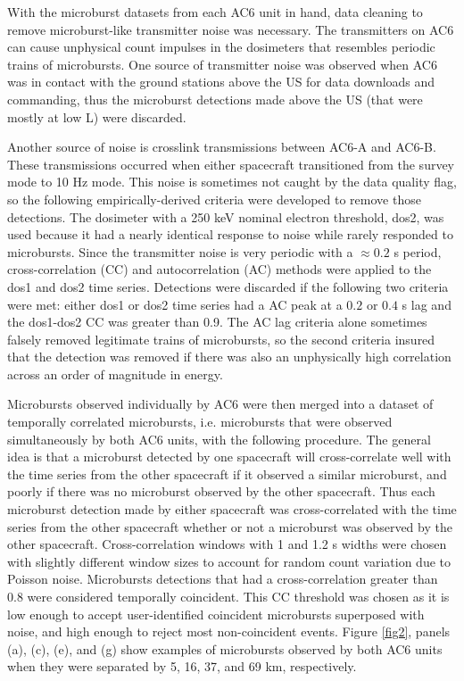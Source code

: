\documentclass[draft]{agujournal2019}
\begin{document}
With the microburst datasets from each AC6 unit in hand, data cleaning to remove microburst-like transmitter noise was necessary. The transmitters on AC6 can cause unphysical count impulses in the dosimeters that resembles periodic trains of microbursts. One source of transmitter noise was observed when AC6 was in contact with the ground stations above the US for data downloads and commanding, thus the microburst detections made above the US (that were mostly at low L) were discarded. 

Another source of noise is crosslink transmissions between AC6-A and AC6-B. These transmissions occurred when either spacecraft transitioned from the survey mode to 10 Hz mode. This noise is sometimes not caught by the data quality flag, so the following empirically-derived criteria were developed to remove those detections. The dosimeter with a 250 keV nominal electron threshold, dos2, was used because it had a nearly identical response to noise while rarely responded to microbursts. Since the transmitter noise is very periodic with a $\approx 0.2$ s period, cross-correlation (CC) and autocorrelation (AC) methods were applied to the dos1 and dos2 time series. Detections were discarded if the following two criteria were met: either dos1 or dos2 time series had a AC peak at a $0.2$ or $0.4$ s lag and the dos1-dos2 CC was greater than 0.9. The AC lag criteria alone sometimes falsely removed legitimate trains of microbursts, so the second criteria insured that the detection was removed if there was also an unphysically high correlation across an order of magnitude in energy.

Microbursts observed individually by AC6 were then merged into a dataset of temporally correlated microbursts, i.e. microbursts that were observed simultaneously by both AC6 units, with the following procedure. The general idea is that a microburst detected by one spacecraft will cross-correlate well with the time series from the other spacecraft if it observed a similar microburst, and poorly if there was no microburst observed by the other spacecraft. Thus each microburst detection made by either spacecraft was cross-correlated with the time series from the other spacecraft whether or not a microburst was observed by the other spacecraft. Cross-correlation windows with 1 and 1.2 s widths were chosen with slightly different window sizes to account for random count variation due to Poisson noise. Microbursts detections that had a cross-correlation greater than $0.8$ were considered temporally coincident. This CC threshold was chosen as it is low enough to accept user-identified coincident microbursts superposed with noise, and high enough to reject most non-coincident events. Figure \ref{fig2}, panels (a), (c), (e), and (g) show examples of microbursts observed by both AC6 units when they were separated by 5, 16, 37, and 69 km, respectively. 
\end{document}
